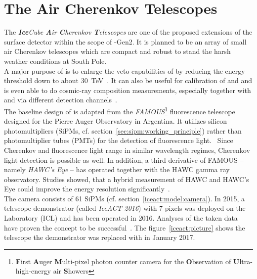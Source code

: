 \section{The \icecube Air Cherenkov Telescopes \iceact}\label{sec:iceact_intro}

The \textit{\textbf{Ice}Cube \textbf{A}ir \textbf{C}herenkov \textbf{T}elescopes} \textit{\iceact} are one of the proposed extensions of the surface detector \icetop within the scope of \icecube-Gen2. It is planned to be an array of small air Cherenkov telescopes which are compact and robust to stand the harsh weather conditions at South Pole.\\

A major purpose of \iceact is to enlarge the veto capabilities of \icetop by reducing the energy threshold down to about \SI{30}{\tera\electronvolt}~\cite{icecube:iceact}. It can also be useful for calibration of \icecube and \icetop and is even able to do cosmic-ray composition measurements, especially together with \icecube and \icetop via different detection channels~\cite{iceact:composition}.\\

The baseline design of \iceact is adapted from the \textit{FAMOUS}\footnote{\textbf{F}irst \textbf{A}uger \textbf{M}ulti-pixel photon counter camera for the \textbf{O}bservation of \textbf{U}ltra-high-energy air \textbf{S}howers} fluorescence telescope designed for the Pierre Auger Observatory in Argentina. It utilizes silicon photomultipliers (SiPMs, cf. section~\ref{sec:sipm:working_principle}) rather than photomultiplier tubes (PMTs) for the detection of fluorescence light.~\cite{famous:telescope} Since Cherenkov and fluorescence light range in similar wavelength regimes, Cherenkov light detection is possible as well. In addition, a third derivative of FAMOUS -- namely \textit{HAWC's Eye} -- has operated together with the HAWC gamma ray observatory. Studies showed, that a hybrid measurement of HAWC and HAWC's Eye could improve the energy resolution significantly~\cite{hawcseye:merlin}.\\

The \iceact camera consists of \num{61} SiPMs (cf. section~\ref{iceact:model:camera}). In 2015, a telescope demonstrator (called \textit{IceACT-2016}) with 7 pixels was deployed on the \icecube Laboratory (ICL) and has been operated in 2016. Analyses of the taken data have proven the concept to be successful~\cite{iceact:erik}. The figure~\ref{iceact:picture} shows the telescope the demonstrator was replaced with in January 2017.


